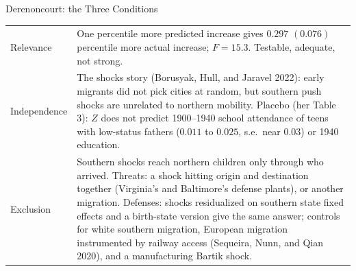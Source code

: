 \documentclass[aspectratio=169,11pt,xcolor=dvipsnames]{beamer}
\newcommand{\srcp}[1]{{\scriptsize\color{gray}(#1)}}
\begin{document}
\begin{frame}{Derenoncourt: the Three Conditions}
\begin{center}\footnotesize
\renewcommand{\arraystretch}{1.15}
\begin{tabular}{@{}lp{10.6cm}@{}}
\toprule
Relevance & One percentile more predicted increase gives $0.297$ $(0.076)$
  percentile more actual increase; $F = 15.3$. \alert{Testable, adequate, not strong.} \\
Independence & The shocks story \srcp{Borusyak, Hull, and Jaravel 2022}:
  early migrants did not pick cities at random, but southern push shocks
  are unrelated to northern mobility. Placebo (her Table 3): $Z$ does not
  predict 1900--1940 school attendance of teens with low-status fathers
  ($0.011$ to $0.025$, s.e.\ near $0.03$) or 1940 education. \\
Exclusion & Southern shocks reach northern children only through who
  arrived. Threats: a shock hitting origin and destination together (Virginia's
  and Baltimore's defense plants), or another migration. Defenses: shocks
  residualized on southern state fixed effects and a birth-state version
  give the same answer; controls for white southern migration, European
  migration instrumented by railway access \srcp{Sequeira, Nunn, and Qian
  2020}, and a manufacturing Bartik shock. \\
\bottomrule
\end{tabular}
\end{center}
\end{frame}
\end{document}
